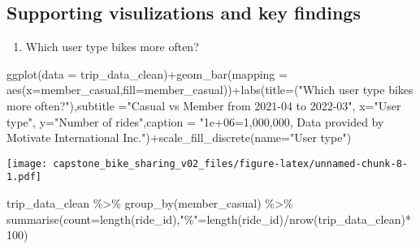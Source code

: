 \documentclass[
]{article}
\newenvironment{Shaded}{\begin{snugshade}}{\end{snugshade}}
\newcommand{\AttributeTok}[1]{\textcolor[rgb]{0.77,0.63,0.00}{#1}}
\newcommand{\DecValTok}[1]{\textcolor[rgb]{0.00,0.00,0.81}{#1}}
\newcommand{\FunctionTok}[1]{\textcolor[rgb]{0.00,0.00,0.00}{#1}}
\newcommand{\NormalTok}[1]{#1}
\newcommand{\OtherTok}[1]{\textcolor[rgb]{0.56,0.35,0.01}{#1}}
\newcommand{\SpecialCharTok}[1]{\textcolor[rgb]{0.00,0.00,0.00}{#1}}
\newcommand{\StringTok}[1]{\textcolor[rgb]{0.31,0.60,0.02}{#1}}
\providecommand{\tightlist}{%
  \setlength{\itemsep}{0pt}\setlength{\parskip}{0pt}}
\begin{document}
\hypertarget{supporting-visulizations-and-key-findings}{%
\subsection{Supporting visulizations and key
findings}\label{supporting-visulizations-and-key-findings}}

\begin{enumerate}
\def\labelenumi{\arabic{enumi}.}
\tightlist
\item
  Which user type bikes more often?
\end{enumerate}

\begin{Shaded}
\begin{Highlighting}[]
\FunctionTok{ggplot}\NormalTok{(}\AttributeTok{data =}\NormalTok{ trip\_data\_clean)}\SpecialCharTok{+}\FunctionTok{geom\_bar}\NormalTok{(}\AttributeTok{mapping =} \FunctionTok{aes}\NormalTok{(}\AttributeTok{x=}\NormalTok{member\_casual,}\AttributeTok{fill=}\NormalTok{member\_casual))}\SpecialCharTok{+}\FunctionTok{labs}\NormalTok{(}\AttributeTok{title=}\NormalTok{(}\StringTok{"Which user type bikes more often?"}\NormalTok{),}\AttributeTok{subtitle =}\StringTok{"Casual vs Member from 2021{-}04 to 2022{-}03"}\NormalTok{, }\AttributeTok{x=}\StringTok{"User type"}\NormalTok{, }\AttributeTok{y=}\StringTok{"Number of rides"}\NormalTok{,}\AttributeTok{caption =} \StringTok{"1e+06=1,000,000, Data provided by Motivate International Inc."}\NormalTok{)}\SpecialCharTok{+}\FunctionTok{scale\_fill\_discrete}\NormalTok{(}\AttributeTok{name=}\StringTok{"User type"}\NormalTok{)}
\end{Highlighting}
\end{Shaded}

\texttt{[image: capstone\_bike\_sharing\_v02\_files/figure-latex/unnamed-chunk-8-1.pdf]}

\begin{Shaded}
\begin{Highlighting}[]
\NormalTok{trip\_data\_clean }\SpecialCharTok{\%\textgreater{}\%} \FunctionTok{group\_by}\NormalTok{(member\_casual) }\SpecialCharTok{\%\textgreater{}\%} \FunctionTok{summarise}\NormalTok{(}\AttributeTok{count=}\FunctionTok{length}\NormalTok{(ride\_id),}\StringTok{"\%"}\OtherTok{=}\FunctionTok{length}\NormalTok{(ride\_id)}\SpecialCharTok{/}\FunctionTok{nrow}\NormalTok{(trip\_data\_clean)}\SpecialCharTok{*}\DecValTok{100}\NormalTok{)}
\end{Highlighting}
\end{Shaded}
\end{document}
